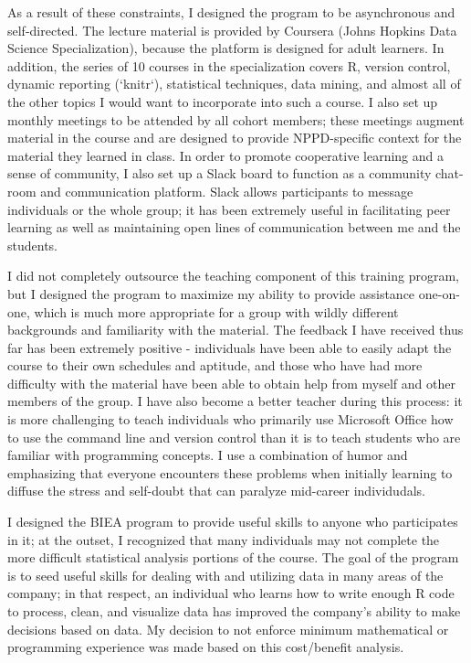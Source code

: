 \documentclass[12pt, letterpaper, sans]{moderncv}
\begin{document}
As a result of these constraints, I designed the program to be asynchronous and self-directed. The lecture material is provided by Coursera (Johns Hopkins Data Science Specialization), because the platform is designed for adult learners. In addition, the series of 10 courses in the specialization covers R, version control, dynamic reporting (`knitr`), statistical techniques, data mining, and almost all of the other topics I would want to incorporate into such a course. I also set up monthly meetings to be attended by all cohort members; these meetings augment material in the course and are designed to provide NPPD-specific context for the material they learned in class. In order to promote cooperative learning and a sense of community, I also set up a Slack board to function as a community chat-room and communication platform. Slack allows participants to message individuals or the whole group; it has been extremely useful in facilitating peer learning as well as maintaining open lines of communication between me and the students. 

I did not completely outsource the teaching component of this training program, but I designed the program to maximize my ability to provide assistance one-on-one, which is much more appropriate for a group with wildly different backgrounds and familiarity with the material. The feedback I have received thus far has been extremely positive - individuals have been able to easily adapt the course to their own schedules and aptitude, and those who have had more difficulty with the material have been able to obtain help from myself and other members of the group. I have also become a better teacher during this process: it is more challenging to teach individuals who primarily use Microsoft Office how to use the command line and version control than it is to teach students who are familiar with programming concepts. I use a combination of humor and emphasizing that everyone encounters these problems when initially learning to diffuse the stress and self-doubt that can paralyze mid-career individudals. 

I designed the BIEA program to provide useful skills to anyone who participates in it; at the outset, I recognized that many individuals may not complete the more difficult statistical analysis portions of the course. The goal of the program is to seed useful skills for dealing with and utilizing data in many areas of the company; in that respect, an individual who learns how to write enough R code to process, clean, and visualize data has improved the company's ability to make decisions based on data. My decision to not enforce minimum mathematical or programming experience was made based on this cost/benefit analysis. 
\end{document}

